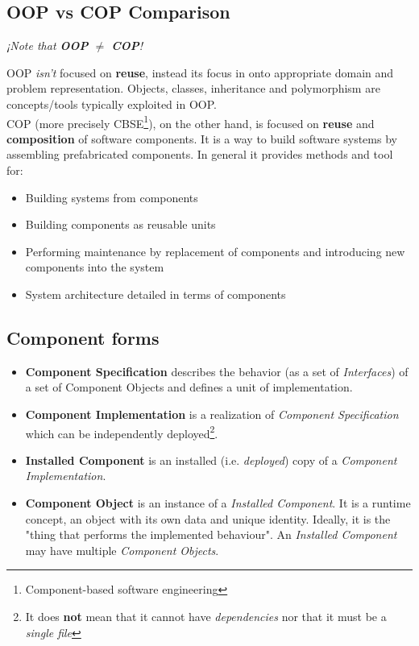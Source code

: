 \subsection{OOP vs COP Comparison}
\begin{center}
\textit{¡Note that \textbf{OOP} $\neq$ \textbf{COP}!}
\end{center}

OOP \textit{isn't} focused on \textbf{reuse}, instead its focus in onto appropriate domain and problem representation. Objects, classes, inheritance and polymorphism are concepts/tools typically exploited in OOP.\\
COP (more precisely CBSE\footnote{Component-based software engineering}), on the other hand, is focused on \textbf{reuse} and \textbf{composition} of software components. It is a way to build software systems by assembling prefabricated components.
In general it provides methods and tool for:
\begin{itemize}
	\item Building systems from components
	\item Building components as reusable units
	\item Performing maintenance by replacement of
	      components and introducing new components
	      into the system
	\item System architecture detailed in terms of
	      components
\end{itemize}

\subsection{Component forms}
\begin{itemize}
    \item \textbf{Component Specification} describes the behavior (as a set of \textit{Interfaces}) of a set of Component Objects and defines a unit of implementation.
    \item \textbf{Component Implementation} is a realization of \textit{Component Specification} which can be independently deployed\footnote{It does \textbf{not} mean that it cannot have \textit{dependencies} nor that it must be a \textit{single file}}.
    \item \textbf{Installed Component} is an installed (i.e. \textit{deployed}) copy of a \textit{Component Implementation}.
    \item \textbf{Component Object} is an instance of a \textit{Installed Component}.
    It is a runtime concept, an object with its own data and unique identity.
    Ideally, it is the "thing that performs the implemented behaviour".
    An \textit{Installed Component} may have multiple \textit{Component Objects}.
\end{itemize}

